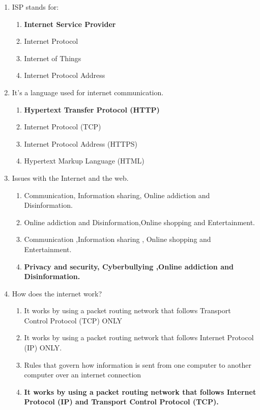 \documentclass{article}
\begin{document}
\begin{enumerate}[label=\arabic*.]
    \item ISP stands for:
        \begin{enumerate}
            \item \textbf{Internet Service Provider}
            \item Internet Protocol
            \item Internet of Things
            \item Internet Protocol Address
        \end{enumerate}
    
    \item It's a language used for internet communication.
        \begin{enumerate}
            \item \textbf{Hypertext Transfer Protocol (HTTP)}
            \item Internet Protocol (TCP)
            \item Internet Protocol Address (HTTPS)
            \item Hypertext Markup Language (HTML)
        \end{enumerate}
    \item Issues with the Internet and the web.
        \begin{enumerate}
            \item Communication, Information sharing, Online addiction and Disinformation.
            \item Online addiction and Disinformation,Online shopping and Entertainment.
            \item Communication ,Information sharing , Online shopping and Entertainment.
            \item \textbf{Privacy and security, Cyberbullying ,Online addiction and Disinformation.}
        \end{enumerate}
    
    \item How does the internet work?
        \begin{enumerate}
            \item It works by using a packet routing network that follows Transport Control Protocol (TCP) ONLY
            \item It works by using a packet routing network that follows Internet Protocol (IP) ONLY.
            \item Rules that govern how information is sent from one computer to another computer over an internet connection
            \item \textbf{It works by using a packet routing network that follows Internet Protocol (IP) and Transport Control Protocol (TCP).}
        \end{enumerate}


\end{enumerate}
\end{document}
